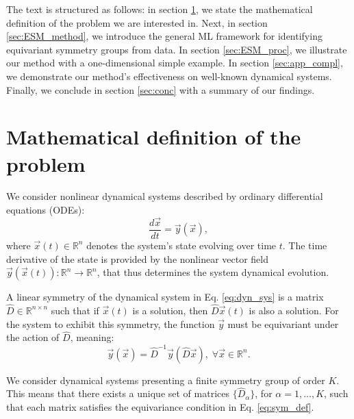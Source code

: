
The text is structured as follows: in section \ref{sec:math_def}, we state the mathematical definition of the problem we are interested in. Next, in section \ref{sec:ESM_method}, we introduce the general ML framework for identifying equivariant symmetry groups from data. In section \ref{sec:ESM_proc}, we illustrate our method with a one-dimensional simple example. In section \ref{sec:app_compl}, we demonstrate our method's effectiveness on well-known dynamical systems. Finally, we conclude in section \ref{sec:conc} with a summary of our findings.


\section{Mathematical definition of the problem}\label{sec:math_def}


We consider nonlinear dynamical systems described by ordinary differential equations (ODEs):
\begin{equation}\label{eq:dyn_sys}
  \frac{d \vec{x}}{dt} = \vec{y}(\vec{x}),
\end{equation}
where $\vec{x} (t) \in \mathbb{R}^n$ denotes the system's state evolving over time $t$. The time derivative of the state is provided by the nonlinear vector field $\vec{y}\left( \vec{x} (t)\right): \mathbb{R}^n \rightarrow \mathbb{R}^n$, that thus determines the system dynamical evolution.


A linear symmetry of the dynamical system in Eq. \ref{eq:dyn_sys} is a matrix $\hat{D} \in \mathbb{R}^{n \times n}$ such that if $\vec{x}(t)$ is a solution, then $\hat{D} \vec{x}(t)$ is also a solution. For the system to exhibit this symmetry, the function $\vec{y}$ must be equivariant under the action of $\hat{D}$, meaning:
\begin{equation}\label{eq:sym_def}
\vec{y}(\vec{x}) = \hat{D}^{-1} \vec{y}( \hat{D} \vec{x} ), \; \forall \vec{x} \in \mathbb{R}^n.
\end{equation}


We consider dynamical systems presenting a finite symmetry group of order $K$. This means that there exists a unique set of matrices $\{ \hat{D}_{\alpha} \}$, for $\alpha = 1, \dots, K$, such that each matrix satisfies the equivariance condition in Eq. \ref{eq:sym_def}.

